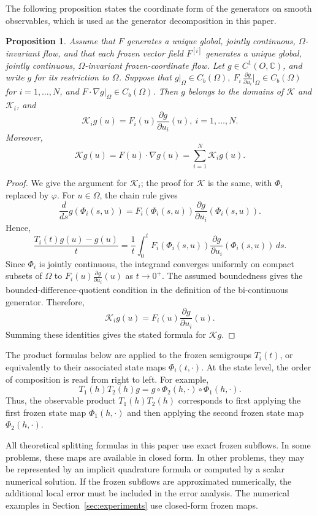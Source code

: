 \documentclass[preprint,1p,times,nopreprintline]{elsarticle}
\newtheorem{proposition}[theorem]{Proposition}
\begin{document}
The following proposition states the coordinate form of the generators on smooth observables, which is used as the generator decomposition in this paper.

\begin{proposition}
\label{prop:coordinate-generators}
Assume that $F$ generates a unique global, jointly continuous, $\Omega$-invariant flow, and that each frozen vector field $F^{[i]}$ generates a unique global, jointly continuous, $\Omega$-invariant frozen-coordinate flow. Let $g\in C^1(O,\mathbb{C})$, and write $g$ for its restriction to $\Omega$. Suppose that
$
g|_\Omega\in C_b(\Omega),
~
F_i\,\frac{\partial g}{\partial u_i}\Big|_\Omega\in C_b(\Omega)$ for $i=1,\ldots,N$, and $F\cdot\nabla g\big|_\Omega\in C_b(\Omega)$. Then $g$ belongs to the domains of $\mathcal{K}$ and $\mathcal{K}_i$, and
\[
\mathcal{K}_i g(u)
=
F_i(u)\frac{\partial g}{\partial u_i}(u),
~
i=1,\ldots,N.
\]
Moreover,
\[
\mathcal{K}g(u)
=
F(u)\cdot\nabla g(u)
=
\sum_{i=1}^N \mathcal{K}_i g(u).
\]
\end{proposition}

\begin{proof}
We give the argument for $\mathcal{K}_i$; the proof for $\mathcal{K}$ is the same, with $\Phi_i$ replaced by $\varphi$. For $u\in\Omega$, the chain rule gives
\[
\frac{d}{ds}g(\Phi_i(s,u))
=
F_i(\Phi_i(s,u))
\frac{\partial g}{\partial u_i}(\Phi_i(s,u)).
\]
Hence,
\[
\frac{T_i(t)g(u)-g(u)}{t}
=
\frac{1}{t}\int_0^t
F_i(\Phi_i(s,u))
\frac{\partial g}{\partial u_i}(\Phi_i(s,u))\,ds .
\]
Since $\Phi_i$ is jointly continuous, the integrand converges uniformly on compact subsets of $\Omega$ to $F_i(u)\frac{\partial g}{\partial u_i}(u)$ as $t\to 0^+$. The assumed boundedness gives the bounded-difference-quotient condition in the definition of the bi-continuous generator. Therefore,
\[
\mathcal{K}_i g(u)
=
F_i(u)\frac{\partial g}{\partial u_i}(u).
\]
Summing these identities gives the stated formula for $\mathcal{K}g$.
\end{proof}

The product formulas below are applied to the frozen semigroups $T_i(t)$, or equivalently to their associated state maps $\Phi_i(t,\cdot)$. At the state level, the order of composition is read from right to left. For example,
\[
T_1(h)T_2(h)g
=
g\circ\Phi_2(h,\cdot)\circ\Phi_1(h,\cdot).
\]
Thus, the observable product $T_1(h)T_2(h)$ corresponds to first applying the first frozen state map $\Phi_1(h,\cdot)$ and then applying the second frozen state map $\Phi_2(h,\cdot)$.

All theoretical splitting formulas in this paper use exact frozen subflows. In some problems, these maps are available in closed form. In other problems, they may be represented by an implicit quadrature formula or computed by a scalar numerical solution. If the frozen subflows are approximated numerically, the additional local error must be included in the error analysis. The numerical examples in Section~\ref{sec:experiments} use closed-form frozen maps.
\end{document}

